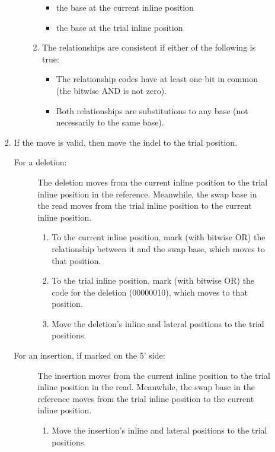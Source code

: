 \documentclass{article}
\begin{document}
\begin{enumerate}
\begin{enumerate}
\begin{enumerate}
\begin{itemize}
\begin{enumerate}
\begin{itemize}
                        \item the base at the current inline position
                        \item the base at the trial inline position
                    \end{itemize}
                    \item The relationships are consistent if either of the following is true:
                    \begin{itemize}
                        \item The relationship codes have at least one bit in common (the bitwise AND is not zero).
                        \item Both relationships are substitutions to any base (not necessarily to the same base).
                    \end{itemize}
                \end{enumerate}
            \end{itemize}
            \item If the move is valid, then move the indel to the trial position.
            \begin{description}
                \item[For a deletion:] The deletion moves from the current inline position to the trial inline position in the reference.
                Meanwhile, the swap base in the read moves from the trial inline position to the current inline position.
                \begin{enumerate}
                    \item To the current inline position, mark (with bitwise OR) the relationship between it and the swap base, which moves to that position.
                    \item To the trial inline position, mark (with bitwise OR) the code for the deletion (00000010), which moves to that position.
                    \item Move the deletion's inline and lateral positions to the trial positions.
                \end{enumerate}
                \item[For an insertion, if marked on the 5' side:] The insertion moves from the current inline position to the trial inline position in the read.
                Meanwhile, the swap base in the reference moves from the trial inline position to the current inline position.
                \begin{enumerate}
                    \item Move the insertion's inline and lateral positions to the trial positions.

\end{enumerate}
\end{description}
\end{enumerate}
\end{enumerate}
\end{enumerate}
\end{document}
